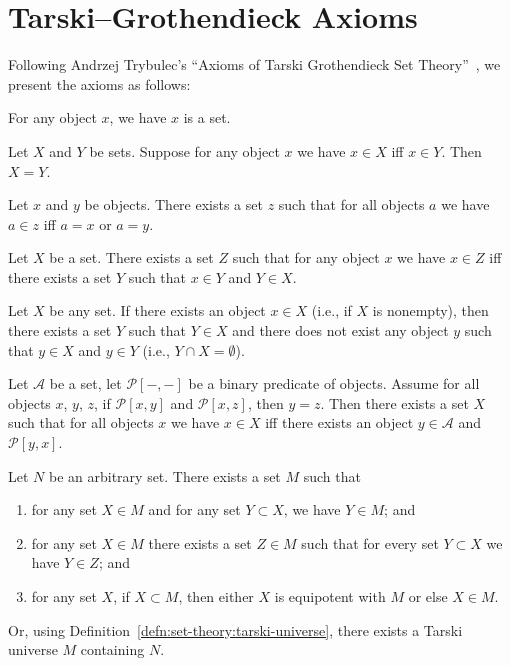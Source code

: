 \section{Tarski--Grothendieck Axioms}

Following Andrzej Trybulec's ``Axioms of Tarski Grothendieck Set
Theory''~\cite{trybulec1990tarski}, we present the axioms as follows:

\begin{axiom}
For any object $x$, we have $x$ is a set.
\end{axiom}

\begin{axiom}[Extensionality]
Let $X$ and $Y$ be sets. 
Suppose for any object $x$ we have $x\in X$ iff $x\in Y$.
Then $X = Y$.
\end{axiom}

\begin{axiom}[Pair]
Let $x$ and $y$ be objects.
There exists a set $z$ such that for all objects $a$ we have $a\in z$ iff
$a=x$ or $a=y$.
\end{axiom}

\begin{axiom}[Union]
Let $X$ be a set.
There exists a set $Z$ such that
for any object $x$ we have $x\in Z$ iff there exists a set $Y$ such
that $x\in Y$ and $Y\in X$.
\end{axiom}

\begin{axiom}[Regularity]
Let $X$ be any set.
If there exists an object $x\in X$ (i.e., if $X$ is nonempty),
then there exists a set $Y$ such that $Y\in X$ and there does not exist
any object $y$ such that $y\in X$ and $y\in Y$ (i.e., $Y\cap X=\emptyset$).
\end{axiom}

\begin{axiom-scheme}
Let $\mathcal{A}$ be a set, let $\mathcal{P}[-,-]$ be a binary
predicate of objects.
Assume for all objects $x$, $y$, $z$, if $\mathcal{P}[x,y]$ and $\mathcal{P}[x,z]$,
then $y=z$.
Then there exists a set $X$ such that for all objects $x$ we have
$x\in X$ iff there exists an object $y\in\mathcal{A}$ and $\mathcal{P}[y,x]$.
\end{axiom-scheme}

\begin{axiom}
Let $N$ be an arbitrary set. There exists a set $M$ such that
\begin{enumerate}
\item for any set $X\in M$ and for any set $Y\subset X$, we have
  $Y\in M$; and
\item for any set $X\in M$ there exists a set $Z\in M$ such that for
  every set $Y\subset X$ we have $Y\in Z$; and
\item for any set $X$, if $X\subset M$, then either $X$ is equipotent
  with $M$ or else $X\in M$.
\end{enumerate}
Or, using Definition~\ref{defn:set-theory:tarski-universe}, there
exists a Tarski universe $M$ containing $N$.
\end{axiom}